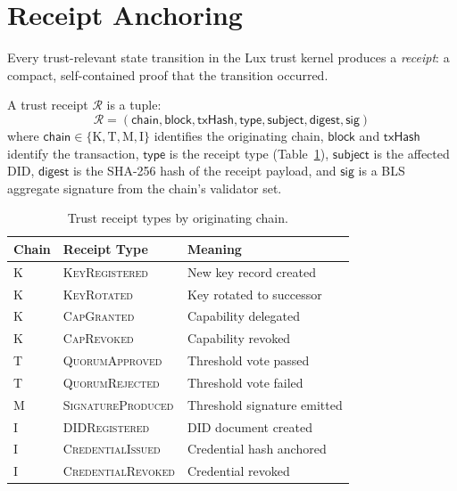 \section{Receipt Anchoring}
\label{sec:receipts}

Every trust-relevant state transition in the Lux trust kernel produces a
\emph{receipt}: a compact, self-contained proof that the transition occurred.

\begin{definition}\label{def:receipt}
A trust receipt $\mathcal{R}$ is a tuple:
\[
    \mathcal{R} = (\mathsf{chain}, \mathsf{block}, \mathsf{txHash},
                   \mathsf{type}, \mathsf{subject}, \mathsf{digest},
                   \mathsf{sig})
\]
where $\mathsf{chain} \in \{\text{K}, \text{T}, \text{M}, \text{I}\}$ identifies
the originating chain, $\mathsf{block}$ and $\mathsf{txHash}$ identify the
transaction, $\mathsf{type}$ is the receipt type (Table~\ref{tab:receipts}),
$\mathsf{subject}$ is the affected DID, $\mathsf{digest}$ is the SHA-256 hash
of the receipt payload, and $\mathsf{sig}$ is a BLS aggregate signature from the
chain's validator set.
\end{definition}

\begin{table}[h]
\centering
\caption{Trust receipt types by originating chain.}
\label{tab:receipts}
\begin{tabular}{llp{6cm}}
\toprule
\textbf{Chain} & \textbf{Receipt Type} & \textbf{Meaning} \\
\midrule
K & \textsc{KeyRegistered} & New key record created \\
K & \textsc{KeyRotated} & Key rotated to successor \\
K & \textsc{CapGranted} & Capability delegated \\
K & \textsc{CapRevoked} & Capability revoked \\
T & \textsc{QuorumApproved} & Threshold vote passed \\
T & \textsc{QuorumRejected} & Threshold vote failed \\
M & \textsc{SignatureProduced} & Threshold signature emitted \\
I & \textsc{DIDRegistered} & DID document created \\
I & \textsc{CredentialIssued} & Credential hash anchored \\
I & \textsc{CredentialRevoked} & Credential revoked \\
\bottomrule
\end{tabular}
\end{table}

